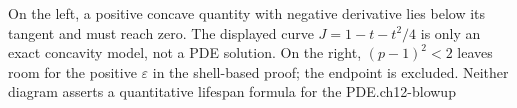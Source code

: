 {On the left, a positive concave quantity with negative derivative lies
below its tangent and must reach zero. The displayed curve
$J=1-t-t^2/4$ is only an exact concavity model, not a PDE solution.
On the right, $(p-1)^2<2$ leaves room for the positive $\varepsilon$
in the shell-based proof; the endpoint is excluded. Neither diagram
asserts a quantitative lifespan formula for the PDE.}{ch12-blowup}
